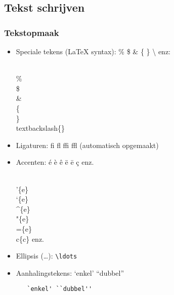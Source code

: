 \documentclass[aspectratio=169]{beamer}
\begin{document}
\subsection{Tekst schrijven}

\begin{frame}[fragile]
 \frametitle{Tekstopmaak}

 \begin{itemize}
   \item<+-> Speciale tekens ({\LaTeX} syntax): \% \$ \& \{ \} \textbackslash{} enz: \\
   \begin{semiverbatim}
     \\\% \\\$ \\\& \\\{ \\\} \\textbackslash\{\}
   \end{semiverbatim}
   \item<+-> Ligaturen: \textrm{fi fl ffi ffl} (automatisch opgemaakt)
   \item<+-> Accenten: \'{e} \`{e} \^{e} \"{e} \={e} \c{c} enz.
   \begin{semiverbatim}
     \\'\{e\} \\`\{e\} \\^\{e\} \\"\{e\} \\=\{e\} \\c\{c\} enz.
   \end{semiverbatim}
   \item<+-> Ellipsis (\ldots): \texttt{\textbackslash{}ldots}
   \item<+-> Aanhalingstekens: `enkel' ``dubbel''
   \begin{verbatim}
   `enkel' ``dubbel''
   \end{verbatim}
 \end{itemize}
\end{frame}
\end{document}
